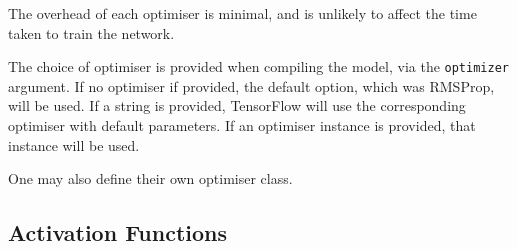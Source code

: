 The overhead of each optimiser is minimal, and is unlikely to affect the time
taken to train the network.

The choice of optimiser is provided when compiling the model, via the
\texttt{optimizer} argument.
If no optimiser if provided, the default option, which was RMSProp, will be
used.
If a string is provided, TensorFlow will use the corresponding optimiser with
default parameters.
If an optimiser instance is provided, that instance will be used.

One may also define their own optimiser class.







\subsection{Activation Functions}

